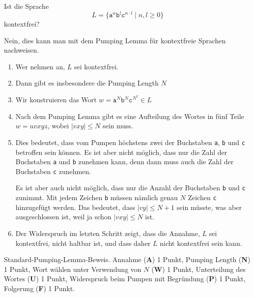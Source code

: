 Ist die Sprache 
\[
L=\{\texttt{a}^n\texttt{b}^l \texttt{c}^{n\cdot l}\mid n,l\ge 0\}
\]
kontextfrei?


\begin{loesung}
Nein, dies kann man mit dem Pumping Lemma für kontextfreie Sprachen
nachweisen.
\begin{enumerate}
\item
Wer nehmen an, $L$ sei kontextfrei.
\item
Dann gibt es insbesondere die Pumping Length $N$
\item
Wir konstruieren das Wort 
$w=\texttt{a}^N \texttt{b}^N \texttt{c}^{N^2}\in L$
\item 
Nach dem Pumping Lemma gibt es eine Aufteilung des Wortes in 
fünf Teile $w=uvxyz$, wobei $|vxy|\le N$ sein muss.
\item
Dies bedeutet, dass vom Pumpen höchstens zwei der Buchstaben
\texttt{a}, \texttt{b} und \texttt{c} betroffen sein können.
Es ist aber nicht möglich, dass nur die Zahl der Buchstaben
\texttt{a} und \texttt{b} zunehmen kann, denn dann muss auch
die Zahl der Buchstaben \texttt{c} zunehmen.

Es ist aber auch nicht möglich, dass nur die Anzahl der Buchstaben
\texttt{b} und \texttt{c} zunimmt.
Mit jedem Zeichen \texttt{b} müssen nämlich genau $N$ Zeichen
\texttt{c} hinzugefügt werden.
Das bedeutet, dass $|vy|\le N+1$ sein müsste, was aber ausgeschlossen
ist, weil ja schon $|vxy|\le N$ ist.
\item
Der Widerspruch im letzten Schritt zeigt, dass die Annahme,
$L$ sei kontextfrei, nicht haltbar ist, und dass daher $L$ nicht
kontextfrei sein kann.
\qedhere
\end{enumerate}
\end{loesung}

\begin{bewertung}
Standard-Pumping-Lemma-Beweis.
Annahme ({\bf A}) 1 Punkt,
Pumping Length ({\bf N}) 1 Punkt,
Wort wählen unter Verwendung von $N$ ({\bf W}) 1 Punkt,
Unterteilung des Wortes ({\bf U}) 1 Punkt,
Widerspruch beim Pumpen mit Begründung ({\bf P}) 1 Punkt,
Folgerung ({\bf F}) 1 Punkt.
\end{bewertung}
